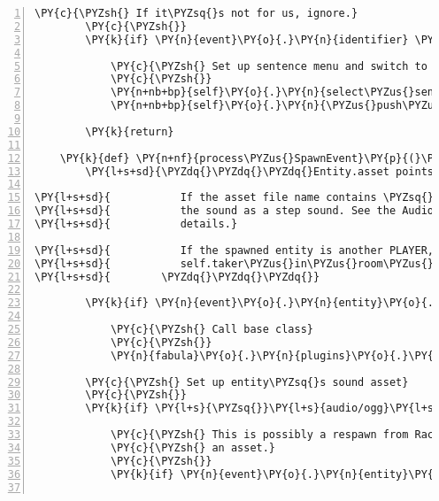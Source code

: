 \begin{Verbatim}[commandchars=\\\{\},numbers=left,firstnumber=1,stepnumber=1]
        \PY{c}{\PYZsh{} If it\PYZsq{}s not for us, ignore.}
        \PY{c}{\PYZsh{}}
        \PY{k}{if} \PY{n}{event}\PY{o}{.}\PY{n}{identifier} \PY{o}{==} \PY{n+nb+bp}{self}\PY{o}{.}\PY{n}{host}\PY{o}{.}\PY{n}{client\PYZus{}id} \PY{o+ow}{and} \PY{n}{event}\PY{o}{.}\PY{n}{sentences}\PY{p}{:}

            \PY{c}{\PYZsh{} Set up sentence menu and switch to can\PYZhy{}speak\PYZhy{}input\PYZhy{}state}
            \PY{c}{\PYZsh{}}
            \PY{n+nb+bp}{self}\PY{o}{.}\PY{n}{select\PYZus{}sentence\PYZus{}menu}\PY{o}{.}\PY{n}{list} \PY{o}{=} \PY{n}{event}\PY{o}{.}\PY{n}{sentences}
            \PY{n+nb+bp}{self}\PY{o}{.}\PY{n}{\PYZus{}push\PYZus{}input\PYZus{}state\PYZus{}on\PYZus{}stack}\PY{p}{(}\PY{n+nb+bp}{self}\PY{o}{.}\PY{n}{INPUT\PYZus{}STATE\PYZus{}CAN\PYZus{}SPEEK}\PY{p}{)}

        \PY{k}{return}

    \PY{k}{def} \PY{n+nf}{process\PYZus{}SpawnEvent}\PY{p}{(}\PY{n+nb+bp}{self}\PY{p}{,} \PY{n}{event}\PY{p}{)}\PY{p}{:}
        \PY{l+s+sd}{\PYZdq{}\PYZdq{}\PYZdq{}Entity.asset points to the sound or the text asset of the Entity.}

\PY{l+s+sd}{           If the asset file name contains \PYZsq{}steps\PYZsq{}, this method will treat}
\PY{l+s+sd}{           the sound as a step sound. See the AudioEntity documentation for}
\PY{l+s+sd}{           details.}

\PY{l+s+sd}{           If the spawned entity is another PLAYER, it will be added to the}
\PY{l+s+sd}{           self.taker\PYZus{}in\PYZus{}room\PYZus{}dict and its name will be announced.}
\PY{l+s+sd}{        \PYZdq{}\PYZdq{}\PYZdq{}}

        \PY{k}{if} \PY{n}{event}\PY{o}{.}\PY{n}{entity}\PY{o}{.}\PY{n}{user\PYZus{}interface} \PY{o+ow}{is} \PY{n+nb+bp}{None}\PY{p}{:}

            \PY{c}{\PYZsh{} Call base class}
            \PY{c}{\PYZsh{}}
            \PY{n}{fabula}\PY{o}{.}\PY{n}{plugins}\PY{o}{.}\PY{n}{ui}\PY{o}{.}\PY{n}{UserInterface}\PY{o}{.}\PY{n}{process\PYZus{}SpawnEvent}\PY{p}{(}\PY{n+nb+bp}{self}\PY{p}{,} \PY{n}{event}\PY{p}{)}

        \PY{c}{\PYZsh{} Set up entity\PYZsq{}s sound asset}
        \PY{c}{\PYZsh{}}
        \PY{k}{if} \PY{l+s}{\PYZsq{}}\PY{l+s}{audio/ogg}\PY{l+s}{\PYZsq{}} \PY{o+ow}{in} \PY{n}{event}\PY{o}{.}\PY{n}{entity}\PY{o}{.}\PY{n}{assets}\PY{o}{.}\PY{n}{keys}\PY{p}{(}\PY{p}{)}\PY{p}{:}

            \PY{c}{\PYZsh{} This is possibly a respawn from Rack, and the entity already has}
            \PY{c}{\PYZsh{} an asset.}
            \PY{c}{\PYZsh{}}
            \PY{k}{if} \PY{n}{event}\PY{o}{.}\PY{n}{entity}\PY{o}{.}\PY{n}{assets}\PY{p}{[}\PY{l+s}{\PYZsq{}}\PY{l+s}{audio/ogg}\PY{l+s}{\PYZsq{}}\PY{p}{]}\PY{o}{.}\PY{n}{data} \PY{o+ow}{is} \PY{o+ow}{not} \PY{n+nb+bp}{None}\PY{p}{:}


\end{Verbatim}
